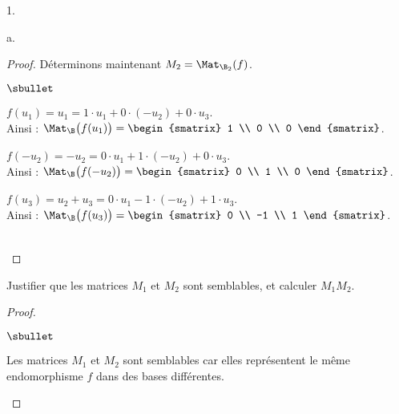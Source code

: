 \documentclass[11pt]{article}%
\begin{document}
\begin{noliste}{1.}
\begin{noliste}{a.}
\begin{proof}
    
    \noindent
      Déterminons maintenant $M_2 = \Mat_{\B_2}(f)$.
      \begin{noliste}{$\sbullet$}
      \item $f(u_1) = u_1 = 1 \cdot u_1 + 0 \cdot (-u_2) + 0 \cdot
        u_3$.\\[.1cm] 
        Ainsi : $\Mat_{\B}\big( f(u_1) \big) =
        \begin{smatrix}
          1 \\
          0 \\
          0
        \end{smatrix}
        $.
        
      \item $f(-u_2) = -u_2 = 0 \cdot u_1 + 1 \cdot (-u_2) + 0 \cdot
        u_3$.\\[.1cm]
        Ainsi : $\Mat_{\B}\big( f(-u_2) \big) =
        \begin{smatrix}
          0 \\
          1 \\
          0
        \end{smatrix}
        $.
        
      \item $f(u_3) = u_2 + u_3 = 0 \cdot u_1 - 1 \cdot (-u_2) + 1
        \cdot u_3$.\\[.1cm]
        Ainsi : $\Mat_{\B}\big( f(u_3) \big) =
        \begin{smatrix}
          0 \\
          -1 \\
          1
        \end{smatrix}
        $.
      \end{noliste}
      ~\\[-1.2cm]
    \end{proof}
    
  \item Justifier que les matrices $M_1$ et $M_2$ sont semblables, et
    calculer $M_1 M_2$.

    \begin{proof}~%
      \begin{noliste}{$\sbullet$}
      \item Les matrices $M_1$ et $M_2$ sont semblables car elles
        représentent le même endomorphisme $f$ dans des bases
        différentes.


\end{noliste}
\end{proof}
\end{noliste}
\end{noliste}
\end{document}
